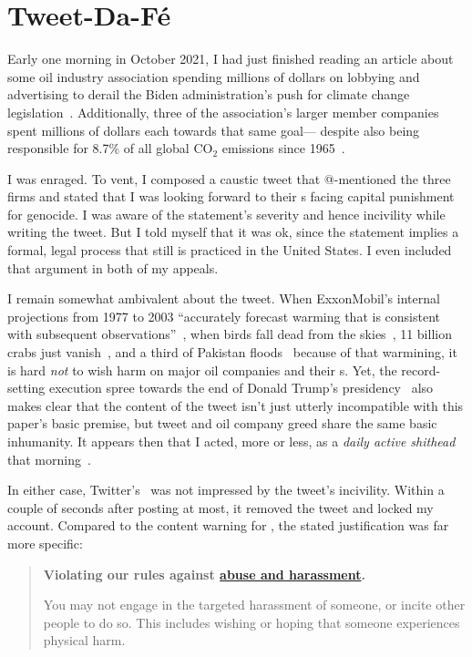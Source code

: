 \section{Tweet-Da-F\'e}
\label{sec:tweet-da-fe}

Early one morning in October 2021, I had just finished reading an article about
some oil industry association spending millions of dollars on lobbying and
advertising to derail the Biden administration's push for climate change
legislation~\cite{Tabuchi2021}. Additionally, three of the association's larger
member companies spent millions of dollars each towards that same goal---%
despite also being responsible for 8.7\% of all global CO$_2$ emissions since
1965~\cite{TaylorWatts2019}.

I was enraged. To vent, I composed a caustic tweet that @-mentioned the three
firms and stated that I was looking forward to their \CEO{}s facing capital
punishment for genocide. I was aware of the statement's severity and hence
incivility while writing the tweet. But I told myself that it was ok, since the
statement implies a formal, legal process that still is practiced in the United
States. I even included that argument in both of my appeals.

I remain somewhat ambivalent about the tweet. When ExxonMobil's internal
projections from 1977 to 2003 ``accurately forecast warming that is consistent
with subsequent observations''~\cite{SupranRahmstorf2023}, when birds fall dead
from the skies~\cite{Dave2022}, 11 billion crabs just
vanish~\cite{Olmstead2022}, and a third of Pakistan floods~\cite{Chughtai2022}
because of that warmining, it is hard \emph{not} to wish harm on major oil
companies and their \CEO{}s. Yet, the record-setting execution spree towards the
end of Donald Trump's
presidency~\cite{Arnsdorf2020,Kovarsky2022,SuebsaengReis2023} also makes clear
that the content of the tweet isn't just utterly incompatible with this paper's
basic premise, but tweet and oil company greed share the same basic inhumanity.
It appears then that I acted, more or less, as a \emph{daily active shithead}
that morning~\cite{Sherman2021}.

In either case, Twitter's \AI\ was not impressed by the tweet's incivility.
Within a couple of seconds after posting at most, it removed the tweet and
locked my account. Compared to the content warning for \DALLE, the stated
justification was far more specific:

\begin{quote}
\openfat\textbf{Violating our rules against
\href{https://web.archive.org/web/20220905021323/https://help.twitter.com/en/rules-and-policies/abusive-behavior}{abuse
and harassment}.}

You may not engage in the targeted harassment of someone, or incite other people
to do so. This includes wishing or hoping that someone experiences physical
harm.\closefat{}
\end{quote}

